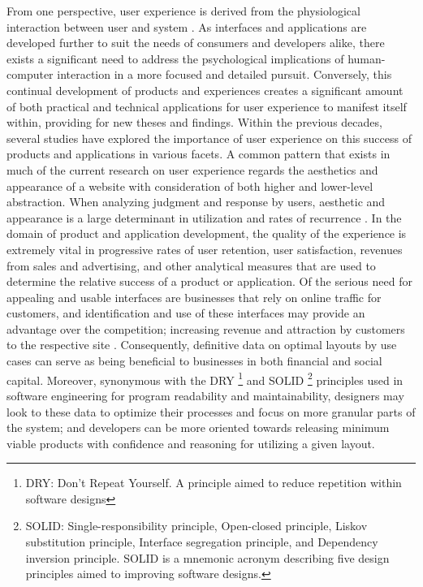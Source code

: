 \documentclass[conference]{IEEEtran}
\begin{document}
From one perspective, user experience is derived from the physiological interaction between user and system \cite{10.1145/2688203}. As interfaces and applications are developed further to suit the needs of consumers and developers alike, there exists a significant need to address the psychological implications of human-computer interaction in a more focused and detailed pursuit. Conversely, this continual development of products and experiences creates a significant amount of both practical and technical applications for user experience to manifest itself within, providing for new theses and findings. Within the previous decades, several studies have explored the importance of user experience on this success of products and applications \cite{doi:10.1080/07370024.2011.646927, mousetracking, parallax} in various facets. A common pattern that exists in much of the current research on user experience regards the aesthetics and appearance of a website with consideration of both higher and lower-level abstraction. When analyzing judgment and response by users, aesthetic and appearance is a large determinant in utilization and rates of recurrence \cite{10.1145/3206025.3206039}. In the domain of product and application development, the quality of the experience is extremely vital in progressive rates of user retention, user satisfaction, revenues from sales and advertising, and other analytical measures that are used to determine the relative success of a product or application. Of the serious need for appealing and usable interfaces are businesses that rely on online traffic for customers, and identification and use of these interfaces may provide an advantage over the competition; increasing revenue and attraction by customers to the respective site \cite{10.1145/3206025.3206039}. Consequently, definitive data on optimal layouts by use cases can serve as being beneficial to businesses in both financial and social capital. Moreover, synonymous with the DRY \footnote{DRY: Don't Repeat Yourself. A principle aimed to reduce repetition within software designs} and SOLID \footnote{SOLID: Single-responsibility principle, Open-closed principle, Liskov substitution principle, Interface segregation principle, and Dependency inversion principle. SOLID is a mnemonic acronym describing five design principles aimed to improving software designs.} principles used in software engineering for program readability and maintainability, designers may look to these data to optimize their processes and focus on more granular parts of the system; and developers can be more oriented towards releasing minimum viable products with confidence and reasoning for utilizing a given layout.
\end{document}

